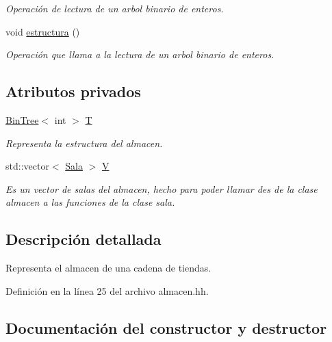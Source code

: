 \begin{DoxyCompactItemize}
\begin{DoxyCompactList}\small\item\em Operación de lectura de un arbol binario de enteros. \end{DoxyCompactList}\item 
void \mbox{\hyperlink{class_almacen_a184cbc0f9e316534ecc04edc0bc895f1}{estructura}} ()
\begin{DoxyCompactList}\small\item\em Operación que llama a la lectura de un arbol binario de enteros. \end{DoxyCompactList}\end{DoxyCompactItemize}
\subsection*{Atributos privados}
\begin{DoxyCompactItemize}
\item 
\mbox{\hyperlink{class_bin_tree}{Bin\+Tree}}$<$ int $>$ \mbox{\hyperlink{class_almacen_a15cd94a2b5bf5f5863b458eec53c9fd4}{T}}
\begin{DoxyCompactList}\small\item\em Representa la estructura del almacen. \end{DoxyCompactList}\item 
std\+::vector$<$ \mbox{\hyperlink{class_sala}{Sala}} $>$ \mbox{\hyperlink{class_almacen_a76cad3a8f2f670e26d7ceb827f7f9e69}{V}}
\begin{DoxyCompactList}\small\item\em Es un vector de salas del almacen, hecho para poder llamar des de la clase almacen a las funciones de la clase sala. \end{DoxyCompactList}\end{DoxyCompactItemize}


\subsection{Descripción detallada}
Representa el almacen de una cadena de tiendas. 

Definición en la línea 25 del archivo almacen.\+hh.



\subsection{Documentación del constructor y destructor}
\mbox{\label{class_almacen_ae5ed0e91d616199b8dbdc1f8780a7efb}} 

